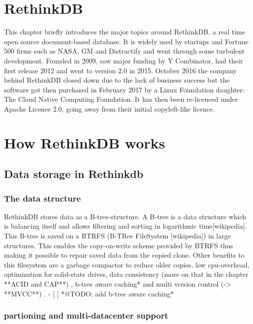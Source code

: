 \section{RethinkDB}

This chapter briefly introduces the major topics around RethinkDB, a real time open source document-based database. It is widely used by startups and Fortune 500 firms such as NASA, GM and Distractify and went through some turbulent development. Founded in 2009, saw major funding by Y Combinator, had their first release 2012 and went to version 2.0 in 2015. October 2016 the company behind RethinkDB closed down due to the lack of business success but the software got then purchased in February 2017 by a Linux Foundation daughter: The Cloud Native Computing Foundation. It has then been re-licenced under Apache Licence 2.0, going away from their initial copyleft-like licence.  

\section{How RethinkDB works}

\subsection{Data storage in Rethinkdb}

\subsubsection{The data structure}

RethinkDB stores data as a B-tree-structure. A B-tree is a data structure which is balancing itself and allows filtering and sorting in logarithmic time[wikipedia]. This B-tree is saved on a BTRFS (B-TRee FileSystem [wikipedia]) in large structures. This enables the copy-on-write scheme provided by BTRFS thus making it possible to repair saved data from the copied clone. Other benefits to this filesystem are a garbage compactor to reduce older copies, low cpu-overhead, optimization for solid-state drives, data consistency (more on that in the chapter **ACID and CAP**) , b-tree aware caching* and multi version control (-> **MVCC**) .
- [ ] *@TODO: add b-tree aware caching*

\subsubsection{partioning and multi-datacenter support}

